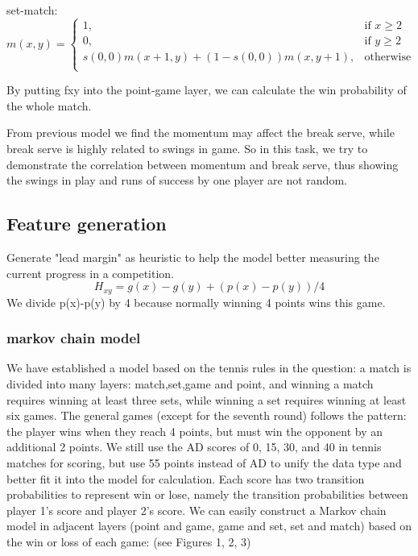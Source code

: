\documentclass{mcmthesis}
\begin{document}
set-match:
\[
  m(x, y) = 
  \begin{cases} 
  1, & \text{if } x \geq 2 \\
  0, & \text{if } y \geq 2 \\
  s(0, 0)m(x+1,y)+(1-s(0,0))m(x,y+1), & \text{otherwise} \\
  \end{cases}
\]

By putting fxy into the point-game layer, we can calculate the win probability of the whole match.%



From previous model we find the momentum may affect the break serve, while break serve is highly related to %
swings in game. So in this task, we try to demonstrate the correlation between momentum and break serve, thus %
showing the swings in play and runs of success by one player are not random.
\subsection{Feature generation}
Generate "lead margin" as heuristic to help the model better measuring the current progress in a competition. 
\[
  H_{xy} = g(x) - g(y) + (p(x)-p(y))/4
\]
We divide p(x)-p(y) by 4 because normally winning 4 points wins this game. 



\subsubsection{markov chain model}
We have established a model based on the tennis rules in the question: a match is divided %
into many layers: match,set,game and point, and winning a match requires winning at least three sets, while winning %
a set requires winning at least six games. The general games (except for the seventh round)%
follows the pattern: the player wins when they reach 4 points, but must win %
 the opponent by an additional 2 points. We still use the AD scores of 0, 15, 30, and 40 in %
 tennis matches for scoring, but use 55 points instead of AD to unify the data type and %
 better fit it into the model for calculation.
Each score has two transition probabilities to represent win or lose, namely the transition probabilities between %
player 1's score and player 2's score. We can easily construct a Markov chain model in %
adjacent layers (point and game, game and set, set and match) based on the win or loss %
of each game: (see Figures 1, 2, 3)
\end{document}
